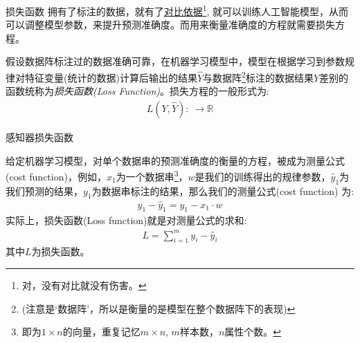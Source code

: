 \documentclass[handout]{ctexbeamer}
\newcommand{\rn}{\mathbb{R}}
\begin{document}
\begin{frame}{损失函数}
拥有了标注的数据，就有了\underline{对比依据}\footnote[frame]{对，没有对比就没有伤害。}, 就可以训练人工智能模型，从而可以调整模型参数，来提升预测准确度。而用来衡量准确度的方程就需要损失方程。

\hfil

\begin{definition}
	假设数据阵标注过的数据准确可靠，在机器学习模型中，模型在根据学习到参数规律对特征变量(统计的数据)计算后输出的结果$\hat{Y}$与数据阵\footnote{(注意是`数据阵'，所以是衡量的是模型在整个数据阵下的表现)}标注的数据结果$Y$差别的函数统称为\textit{损失函数(Loss Function)}。损失方程的一般形式为:
\begin{align*}
	L(Y, \hat{Y}): \ \to \rn 
\end{align*}	
\end{definition}
\end{frame}

\begin{frame}{感知器损失函数}
\begin{definition}
	给定机器学习模型，对单个数据串的预测准确度的衡量的方程，被成为测量公式(cost function)，例如，$x_1$为一个数据串\footnote{即为$1 \times n$的向量，重复记忆$m \times n$, $m$样本数，$n$属性个数。}，$w$是我们的训练得出的规律参数，$\hat{y}_1$为我们预测的结果，$y_1$为数据串标注的结果，那么我们的测量公式(cost function) 为:
	\begin{align*}
		y_1 - \hat{y}_1 = y_1 - x_1 \cdot w 
	\end{align*}
	实际上，损失函数(Loss function)就是对测量公式的求和:
	\begin{align*}
		L = \sum_{i=1}^m y_i - \hat{y}_i 
	\end{align*}
	其中$L$为损失函数。
\end{definition}
\end{frame}
\end{document}

